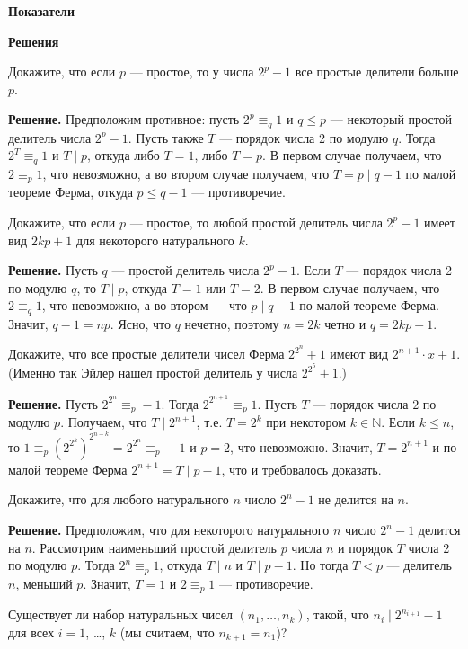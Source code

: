 \centerline{\bf \Huge Показатели}
\centerline{\bf \Huge Решения}

 Докажите, что если $p$ --- простое, то у числа $2^p-1$ все
простые делители больше $p$.

\textbf{Решение.} Предположим противное: пусть $2^p\equiv_q 1$ и $q
\leqslant p$ --- некоторый простой делитель числа $2^p-1$. Пусть
также $T$ --- порядок числа 2 по модулю $q$. Тогда $2^T\equiv_q 1$ и
$T\mid p$, откуда либо $T=1$, либо $T=p$. В первом случае получаем,
что $2\equiv_p 1$, что невозможно, а во втором случае
получаем, что $T = p\mid q-1$ по малой теореме Ферма, откуда
$p\leqslant q-1$ --- противоречие.

 Докажите, что если $p$ --- простое, то любой простой делитель
числа $2^p-1$ имеет вид $2kp+1$ для некоторого натурального $k$.

\textbf{Решение.} Пусть $q$ --- простой делитель числа $2^p-1$. Если $T$ ---
порядок числа 2 по модулю $q$, то $T\mid p$, откуда $T=1$ или $T=2$.
В первом случае получаем, что $2\equiv_q 1$, что невозможно,
а во втором --- что $p\mid q-1$ по малой теореме Ферма. Значит,
$q-1=np$. Ясно, что $q$ нечетно, поэтому $n=2k$ четно и $q=2kp+1$.

 Докажите, что все простые делители чисел Ферма $2^{2^n}+1$ имеют вид
$2^{n+1}\cdot x+1$. (Именно так Эйлер нашел простой делитель у числа
$2^{2^5}+1$.)

\textbf{Решение.} Пусть $2^{2^n}\equiv_p -1$. Тогда $2^{2^{n+1}}\equiv_p
1$. Пусть $T$ --- порядок числа $2$ по модулю $p$.
Получаем, что $T\mid 2^{n+1}$, т.е. $T=2^k$ при некотором
$k\in\mathbb{N}$. Если $k\leqslant n$, то $1\equiv_p
(2^{2^k})^{2^{n-k}}=2^{2^n}\equiv_p -1$ и $p=2$, что
невозможно. Значит, $T=2^{n+1}$ и по малой теореме Ферма
$2^{n+1}=T\mid p-1$, что и требовалось доказать.

 Докажите, что для любого натурального $n$ число $2^n-1$ не
делится на $n$.

\textbf{Решение.} Предположим, что для некоторого натурального $n$ число $2^n-1$
делится на $n$. Рассмотрим наименьший простой делитель $p$ числа $n$
и порядок $T$ числа 2 по модулю $p$. Тогда $2^n\equiv_p 1$,
откуда $T\mid n$ и $T\mid p-1$. Но тогда $T < p$ --- делитель $n$,
меньший $p$. Значит, $T=1$ и $2\equiv_p 1$ --- противоречие.

 Существует ли набор натуральных чисел $(n_1,\ldots,n_k)$,
такой, что $n_i\mid 2^{n_{i+1}}-1$ для всех $i=1$, \ldots, $k$ (мы
считаем, что $n_{k+1}=n_1$)?

